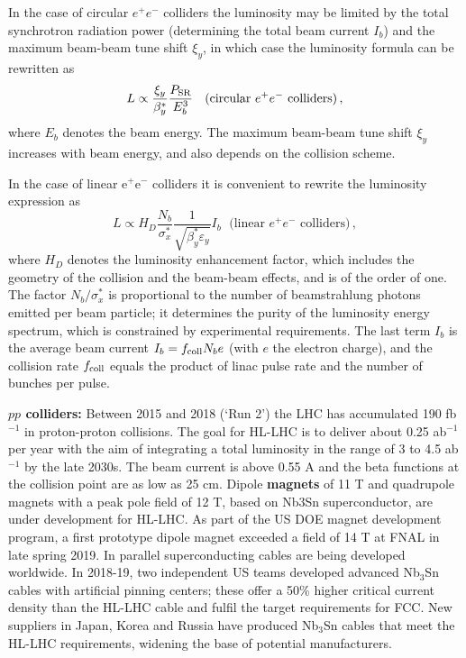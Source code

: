In the case of circular $e^+e^-$ 
colliders the luminosity may be limited by the total synchrotron radiation power (determining the total beam current $I_{b}$) and the maximum beam-beam tune shift $\xi_y$, 
in which case the
luminosity formula can be rewritten as  
\begin{equation}
    L \propto \frac{\xi_y}{\beta_{y}^{\ast}} 
    \frac{P_{\rm SR}}{E_b^{3}} \; \, \, \ \text{(circular $e^+e^-$ colliders)}\, ,
\end{equation}
where $E_{b}$ denotes the beam energy. 
The maximum beam-beam tune shift $\xi_y$ increases
with beam energy, and also depends on the collision scheme.

In the case of linear e$^+$e$^-$ 
colliders it is convenient
to rewrite the luminosity expression as
\begin{equation}
L \propto H_{D} \frac{N_{b}}{\sigma_{x}^\ast}
\frac{1}{\sqrt{\beta_{y}^{\ast}\varepsilon_y}} I_{b}
\; \, \, \text{(linear $e^+e^-$ colliders)}\, ,
\end{equation}
where $H_{D}$ denotes the luminosity enhancement factor, which includes the geometry of the collision and the
beam-beam effects, and is of the order of one.
The factor $N_{b}/\sigma_{x}^{\ast}$ is proportional to the number of beamstrahlung photons emitted per beam particle; it determines the purity of the luminosity energy spectrum, which is constrained by
experimental requirements.
The last term $I_{b}$ 
is the average beam current $I_{b}=f_{\rm coll}  N_{b} e$ (with $e$ the electron charge),
and the collision rate $f_{\rm coll}$ equals the product of linac pulse 
rate and the number of bunches per pulse.

{\bf $pp$ colliders:} Between  2015 and 2018 (`Run 2') the LHC has accumulated 190 fb$^{-1}$ in proton-proton collisions. 
The goal for HL-LHC is to deliver about 0.25 ab$^{-1}$ per year with the aim of integrating a total luminosity in the range of 3 to 4.5 ab$^{-1}$ by the late 2030s. 
The beam current is above 0.55 A and the beta functions at the collision point are as low as 25 cm. Dipole {\bf magnets} of 11 T and quadrupole magnets with a peak pole field of 12 T, based on Nb3Sn superconductor, are under development for HL-LHC. As part of the US DOE magnet development program, a first prototype dipole magnet exceeded a field of 14 T at FNAL in late spring 2019. In parallel superconducting cables are being developed worldwide. In 2018-19, two independent US teams developed advanced Nb$_3$Sn cables with artificial pinning centers; these offer a 50\% higher critical current density than the HL-LHC cable and fulfil the target requirements for FCC. New suppliers in Japan, Korea and Russia have produced Nb$_3$Sn cables that meet the HL-LHC requirements, widening the base of potential manufacturers.


